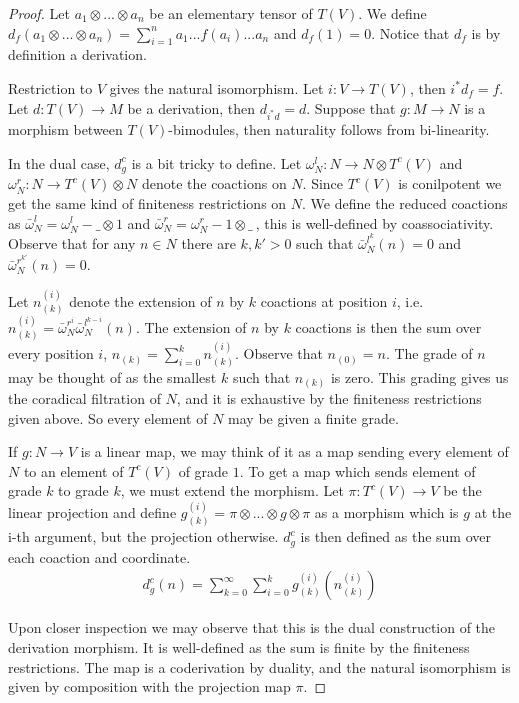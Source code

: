 \documentclass[../thesis.tex]{subfiles}
\begin{document}
            \begin{proof}
                Let $a_1\otimes ... \otimes a_n$ be an elementary tensor of $T(V)$. We define $d_f(a_1\otimes ... \otimes a_n) = \sum_{i=1}^n a_1...f(a_i)...a_n$ and $d_f(1) = 0$. Notice that $d_f$ is by definition a derivation.
                
                Restriction to $V$ gives the natural isomorphism. Let $i : V\rightarrow T(V)$, then $i^*d_f = f$. Let $d : T(V) \rightarrow M$ be a derivation, then $d_{i^*d}=d$. Suppose that $g: M \rightarrow N$ is a morphism between $T(V)$-bimodules, then naturality follows from bi-linearity.

                In the dual case, $d_g^c$ is a bit tricky to define. Let $\omega^l_N:N\rightarrow N\otimes T^c(V)$ and $\omega^r_N : N\rightarrow T^c(V) \otimes N$ denote the coactions on $N$. Since $T^c(V)$ is conilpotent we get the same kind of finiteness restrictions on $N$. We define the reduced coactions as $\bar{\omega}^l_N = \omega^l_N - \_\otimes 1$ and $\bar{\omega}^r_N = \omega^r_N - 1\otimes\_\ $, this is well-defined by coassociativity. Observe that for any $n\in N$ there are $k, k'>0$ such that ${\bar{\omega}^{l^k}_N}(n) = 0$ and ${\bar{\omega}^{r^{k'}}_N}(n)=0$.

                Let $n_{(k)}^{(i)}$ denote the extension of $n$ by $k$ coactions at position $i$, i.e. $n_{(k)}^{(i)} = \bar{\omega}^{r^i}_N\bar{\omega}^{l^{k-i}}_N(n)$. The extension of $n$ by $k$ coactions is then the sum over every position $i$, $n_{(k)} = \sum_{i=0}^kn_{(k)}^{(i)}$. Observe that $n_{(0)} = n$. The grade of $n$ may be thought of as the smallest $k$ such that $n_{(k)}$ is zero. This grading gives us the coradical filtration of $N$, and it is exhaustive by the finiteness restrictions given above. So every element of $N$ may be given a finite grade.

                If $g: N \rightarrow V$ is a linear map, we may think of it as a map sending every element of $N$ to an element of $T^c(V)$ of grade $1$. To get a map which sends element of grade $k$ to grade $k$, we must extend the morphism. Let $\pi : T^c(V) \rightarrow V$ be the linear projection and define $g_{(k)}^{(i)} = \pi\otimes ... \otimes g \otimes \pi$ as a morphism which is $g$ at the i-th argument, but the projection otherwise. $d_g^c$ is then defined as the sum over each coaction and coordinate.
                \begin{align*}
                    d_g^c(n) = \sum_{k=0}^\infty \sum_{i=0}^k g_{(k)}^{(i)}(n_{(k)}^{(i)})
                \end{align*}
                
                Upon closer inspection we may observe that this is the dual construction of the derivation morphism. It is well-defined as the sum is finite by the finiteness restrictions. The map is a coderivation by duality, and the natural isomorphism is given by composition with the projection map $\pi$.
            \end{proof}
\end{document}
